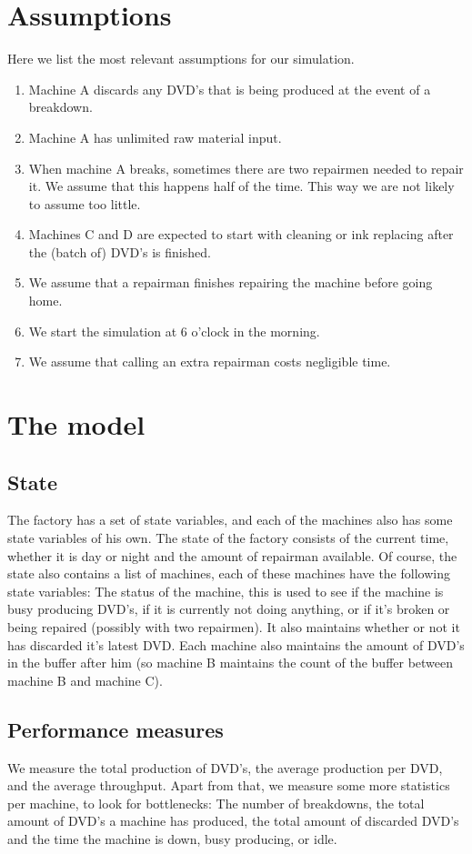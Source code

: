 \documentclass{article}
\begin{document}
\section{Assumptions}
Here we list the most relevant assumptions for our simulation.
\begin{enumerate}
    \item
        Machine A discards any DVD's that is being produced at the event of a breakdown.
    \item
        Machine A has unlimited raw material input.
    \item
        When machine A breaks, sometimes there are two repairmen needed to repair it.
        We assume that this happens half of the time.
        This way we are not likely to assume too little.
    \item
        Machines C and D are expected to start with cleaning or ink replacing after the (batch of) DVD's is finished.
    \item
        We assume that a repairman finishes repairing the machine before going home.
    \item
        We start the simulation at 6 o'clock in the morning.
    \item
        We assume that calling an extra repairman costs negligible time.
\end{enumerate}


\section{The model}
\subsection{State}
The factory has a set of state variables, and each of the machines also has some state variables of his own.
The state of the factory consists of the current time, whether it is day or night and the amount of repairman available.
Of course, the state also contains a list of machines, each of these machines have the following state variables:
The status of the machine, this is used to see if the machine is busy producing DVD's, if it is currently not doing anything, or if it's broken or being repaired (possibly with two repairmen).
It also maintains whether or not it has discarded it's latest DVD\@.
Each machine also maintains the amount of DVD's in the buffer after him (so machine B maintains the count of the buffer between machine B and machine C).

\subsection{Performance measures}
\label{performance_measures}
We measure the total production of DVD's, the average production per DVD,
and the average throughput.
Apart from that, we measure some more statistics per machine, to look for bottlenecks:
The number of breakdowns, the total amount of DVD's a machine has produced,
the total amount of discarded DVD's and the time the machine is down, busy producing, or idle.
\end{document}
